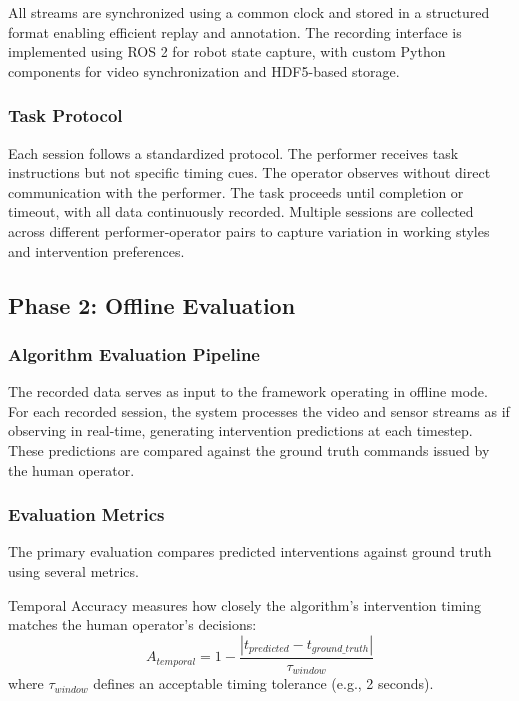 \documentclass[sensors,article,submit,pdftex,moreauthors]{Definitions/mdpi}
\begin{document}
All streams are synchronized using a common clock and stored in a structured format enabling efficient replay and annotation. The recording interface is implemented using ROS 2 for robot state capture, with custom Python components for video synchronization and HDF5-based storage.

\subsubsection{Task Protocol}

Each session follows a standardized protocol. The performer receives task instructions but not specific timing cues. The operator observes without direct communication with the performer. The task proceeds until completion or timeout, with all data continuously recorded. Multiple sessions are collected across different performer-operator pairs to capture variation in working styles and intervention preferences.

\subsection{Phase 2: Offline Evaluation}

\subsubsection{Algorithm Evaluation Pipeline}

The recorded data serves as input to the framework operating in offline mode. For each recorded session, the system processes the video and sensor streams as if observing in real-time, generating intervention predictions at each timestep. These predictions are compared against the ground truth commands issued by the human operator.

\subsubsection{Evaluation Metrics}

The primary evaluation compares predicted interventions against ground truth using several metrics.

Temporal Accuracy measures how closely the algorithm's intervention timing matches the human operator's decisions:
\begin{equation}
    A_{temporal} = 1 - \frac{|t_{predicted} - t_{ground\_truth}|}{\tau_{window}}
\end{equation}
where $\tau_{window}$ defines an acceptable timing tolerance (e.g., 2 seconds).
\end{document}
